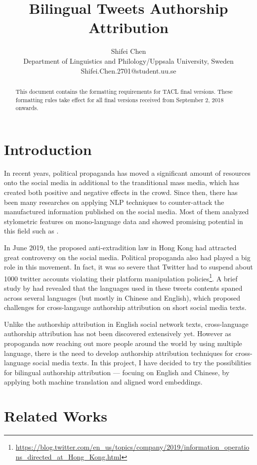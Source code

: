 \documentclass[11pt,a4paper]{article}
\title{Bilingual Tweets Authorship Attribution}
\author{
 Shifei Chen \\
 Department of Linguistics and Philology/Uppsala University, Sweden \\
  {\sf Shifei.Chen.2701@student.uu.se} \\
}
\date{}
\newcommand{\taclpaper}{final version\xspace}
\newcommand{\taclpapers}{final versions\xspace}
\newcommand{\taclpaper}{submission\xspace}
\newcommand{\taclpapers}{{\taclpaper}s\xspace}
\begin{document}
\maketitle
\begin{abstract}
  This document contains the formatting requirements for TACL \taclpapers. These
  formatting rules take effect for all \taclpapers received from September 2, 2018
  onwards.
\end{abstract}

\section{Introduction}
In recent years, political propaganda has moved a significant amount of resources onto the social media in additional to the tranditional mass media, which has created both positive and negative effects in the crowd. Since then, there has been many researches on applying NLP techniques to counter-attack the manufactured information published on the social media. Most of them analyzed stylometric features on mono-language data and showed promising potential in this field such as \citet{rocha2016authorship}.

In June 2019, the proposed anti-extradition law in Hong Kong had attracted great controversy on the social media. Political propoganda also had played a big role in this movement. In fact, it was so severe that Twitter had to suspend about 1000 twitter accounts violating their platform manipulation policies\footnote{\url{https://blog.twitter.com/en_us/topics/company/2019/information_operations_directed_at_Hong_Kong.html}}. A brief study by \citet{wood_mcminn_feng_2019} had revealed that the languages used in these tweets contents spaned across several languages (but mostly in Chinese and English), which proposed challenges for cross-langauge authorship attribution on short social media texts.

Unlike the authorship attribution in English social network texts, cross-language authorship attribution has not been discovered extensively yet. However as propoganda now reaching out more people around the world by using multiple language, there is the need to develop authorship attribution techniques for cross-language social media texts. In this project, I have decided to try the possibilities for bilingual authorship attribution --- focuing on English and Chinese, by applying both machine translation and aligned word embeddings. 

\section{Related Works}
\end{document}
